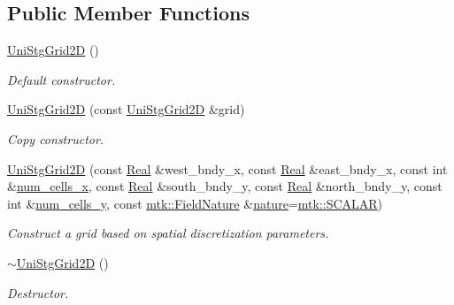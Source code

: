 \subsection*{Public Member Functions}
\begin{DoxyCompactItemize}
\item 
\hyperlink{classmtk_1_1UniStgGrid2D_a40db9a6d21e0f4cf70c478fcc3b94531}{Uni\+Stg\+Grid2\+D} ()
\begin{DoxyCompactList}\small\item\em Default constructor. \end{DoxyCompactList}\item 
\hyperlink{classmtk_1_1UniStgGrid2D_aab6e54b48c3f32de808460ef46f598d4}{Uni\+Stg\+Grid2\+D} (const \hyperlink{classmtk_1_1UniStgGrid2D}{Uni\+Stg\+Grid2\+D} \&grid)
\begin{DoxyCompactList}\small\item\em Copy constructor. \end{DoxyCompactList}\item 
\hyperlink{classmtk_1_1UniStgGrid2D_ad8813b1ffcf23bb759f59f8524702e80}{Uni\+Stg\+Grid2\+D} (const \hyperlink{group__c01-roots_gac080bbbf5cbb5502c9f00405f894857d}{Real} \&west\+\_\+bndy\+\_\+x, const \hyperlink{group__c01-roots_gac080bbbf5cbb5502c9f00405f894857d}{Real} \&east\+\_\+bndy\+\_\+x, const int \&\hyperlink{classmtk_1_1UniStgGrid2D_a2d182866a398aba8e4829590e85bf939}{num\+\_\+cells\+\_\+x}, const \hyperlink{group__c01-roots_gac080bbbf5cbb5502c9f00405f894857d}{Real} \&south\+\_\+bndy\+\_\+y, const \hyperlink{group__c01-roots_gac080bbbf5cbb5502c9f00405f894857d}{Real} \&north\+\_\+bndy\+\_\+y, const int \&\hyperlink{classmtk_1_1UniStgGrid2D_aed05a801cc9a76dba0ff203cea58a61a}{num\+\_\+cells\+\_\+y}, const \hyperlink{group__c02-enums_ga4c54f2a329cfb4e56213b02a259d19e2}{mtk\+::\+Field\+Nature} \&\hyperlink{classmtk_1_1UniStgGrid2D_a99a3a9cdb05b7306be99bde935509e30}{nature}=\hyperlink{namespacemtk_ga4c54f2a329cfb4e56213b02a259d19e2a8f3d9a4b6a7b7f2c7afa61ca113d0db9}{mtk\+::\+S\+C\+A\+L\+A\+R})
\begin{DoxyCompactList}\small\item\em Construct a grid based on spatial discretization parameters. \end{DoxyCompactList}\item 
\hyperlink{classmtk_1_1UniStgGrid2D_a55615fed9674be8d8a48a1105e5a1476}{$\sim$\+Uni\+Stg\+Grid2\+D} ()
\begin{DoxyCompactList}\small\item\em Destructor. \end{DoxyCompactList}\item 

\end{DoxyCompactItemize}
